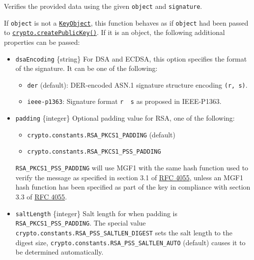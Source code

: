 Verifies the provided data using the given \texttt{object} and
\texttt{signature}.

If \texttt{object} is not a
\hyperref[class-keyobject]{\texttt{KeyObject}}, this function behaves as
if \texttt{object} had been passed to
\hyperref[cryptocreatepublickeykey]{\texttt{crypto.createPublicKey()}}.
If it is an object, the following additional properties can be passed:

\begin{itemize}
\item
  \texttt{dsaEncoding} \{string\} For DSA and ECDSA, this option
  specifies the format of the signature. It can be one of the following:

  \begin{itemize}
  \tightlist
  \item
    \texttt{\textquotesingle{}der\textquotesingle{}} (default):
    DER-encoded ASN.1 signature structure encoding \texttt{(r,\ s)}.
  \item
    \texttt{\textquotesingle{}ieee-p1363\textquotesingle{}}: Signature
    format \texttt{r\ \textbar{}\textbar{}\ s} as proposed in
    IEEE-P1363.
  \end{itemize}
\item
  \texttt{padding} \{integer\} Optional padding value for RSA, one of
  the following:

  \begin{itemize}
  \tightlist
  \item
    \texttt{crypto.constants.RSA\_PKCS1\_PADDING} (default)
  \item
    \texttt{crypto.constants.RSA\_PKCS1\_PSS\_PADDING}
  \end{itemize}

  \texttt{RSA\_PKCS1\_PSS\_PADDING} will use MGF1 with the same hash
  function used to verify the message as specified in section 3.1 of
  \href{https://www.rfc-editor.org/rfc/rfc4055.txt}{RFC 4055}, unless an
  MGF1 hash function has been specified as part of the key in compliance
  with section 3.3 of
  \href{https://www.rfc-editor.org/rfc/rfc4055.txt}{RFC 4055}.
\item
  \texttt{saltLength} \{integer\} Salt length for when padding is
  \texttt{RSA\_PKCS1\_PSS\_PADDING}. The special value
  \texttt{crypto.constants.RSA\_PSS\_SALTLEN\_DIGEST} sets the salt
  length to the digest size,
  \texttt{crypto.constants.RSA\_PSS\_SALTLEN\_AUTO} (default) causes it
  to be determined automatically.
\end{itemize}

